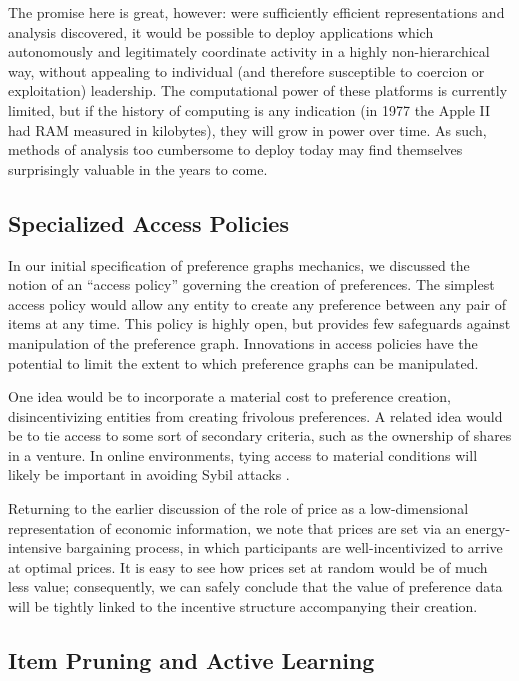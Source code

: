 The promise here is great, however: were sufficiently efficient representations and analysis discovered, it would be possible to deploy applications which autonomously and legitimately coordinate activity  in a highly non-hierarchical way, without appealing to individual (and therefore susceptible to coercion or exploitation) leadership.
The computational power of these platforms is currently limited, but if the history of computing is any indication (in 1977 the Apple II had RAM measured in kilobytes), they will grow in power over time.
As such, methods of analysis too cumbersome to deploy today may find themselves surprisingly valuable in the years to come.

\subsection{Specialized Access Policies}

In our initial specification of preference graphs mechanics, we discussed the notion of an ``access policy'' governing the creation of preferences.
The simplest access policy would allow any entity to create any preference between any pair of items at any time.
This policy is highly open, but provides few safeguards against manipulation of the preference graph.
Innovations in access policies have the potential to limit the extent to which preference graphs can be manipulated.

One idea would be to incorporate a material cost to preference creation, disincentivizing  entities from creating frivolous preferences.
A related idea would be to tie access to some sort of secondary criteria, such as the ownership of shares in a venture.
In online environments, tying access to material conditions will likely be important in avoiding Sybil attacks \citep{danezis:2006}.

Returning to the earlier discussion of the role of price as a low-dimensional representation of economic information, we note that prices are set via an energy-intensive bargaining process, in which participants are well-incentivized to arrive at optimal prices.
It is easy to see how prices set at random would be of much less value; consequently, we can safely conclude that the value of preference data will be tightly linked to the incentive structure accompanying their creation.

\subsection{Item Pruning and Active Learning}

